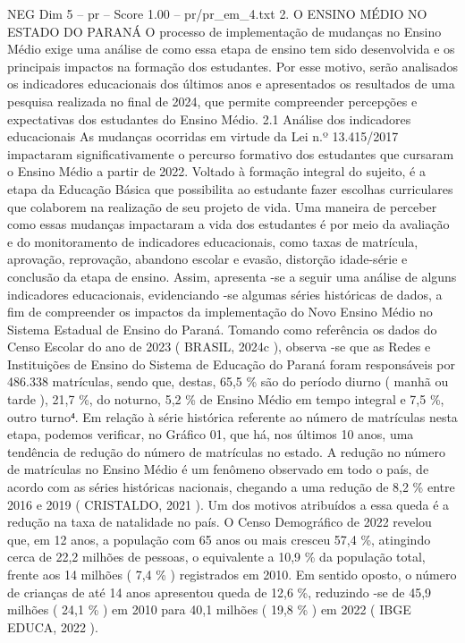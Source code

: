 \begin{textsample}{NEG Dim 5 – pr – Score 1.00 – pr/pr\_em\_4.txt}  \label{ex:f5_neg_235}
2.
O ENSINO MÉDIO NO ESTADO DO PARANÁ O processo de implementação de mudanças no Ensino Médio exige uma análise de como essa etapa de ensino tem sido desenvolvida e os principais impactos na formação dos estudantes.
Por esse motivo, serão analisados os indicadores educacionais dos últimos anos e apresentados os resultados de uma pesquisa realizada no final de 2024, que permite compreender percepções e expectativas dos estudantes do Ensino Médio. 2.1 Análise dos indicadores educacionais As mudanças ocorridas em virtude da Lei n.º 13.415/2017 impactaram significativamente o percurso formativo dos estudantes que cursaram o Ensino Médio a partir de 2022.
Voltado à formação integral do sujeito, é a etapa da Educação Básica que possibilita ao estudante fazer escolhas curriculares que colaborem na realização de seu projeto de vida.
Uma maneira de perceber como essas mudanças impactaram a vida dos estudantes é por meio da avaliação e do monitoramento de indicadores educacionais, como taxas de matrícula, aprovação, reprovação, abandono escolar e evasão, distorção idade-série e conclusão da etapa de ensino.
Assim, apresenta -se a seguir uma análise de alguns indicadores educacionais, evidenciando -se algumas séries históricas de dados, a fim de compreender os impactos da implementação do Novo Ensino Médio no Sistema Estadual de Ensino do Paraná.
Tomando como referência os dados do Censo Escolar do ano de 2023 ( BRASIL, 2024c ), observa -se que as Redes e Instituições de Ensino do Sistema de Educação do Paraná foram responsáveis por 486.338 matrículas, sendo que, destas, 65,5 \% são do período diurno ( manhã ou tarde ), 21,7 \%, do noturno, 5,2 \% de Ensino Médio em tempo integral e 7,5 \%, outro turno⁴.
Em relação à série histórica referente ao número de matrículas nesta etapa, podemos verificar, no Gráfico 01, que há, nos últimos 10 anos, uma tendência de redução do número de matrículas no estado.
A redução no número de matrículas no Ensino Médio é um fenômeno observado em todo o país, de acordo com as séries históricas nacionais, chegando a uma redução de 8,2 \% entre 2016 e 2019 ( CRISTALDO, 2021 ).
Um dos motivos atribuídos a essa queda é a redução na taxa de natalidade no país.
O Censo Demográfico de 2022 revelou que, em 12 anos, a população com 65 anos ou mais cresceu 57,4 \%, atingindo cerca de 22,2 milhões de pessoas, o equivalente a 10,9 \% da população total, frente aos 14 milhões ( 7,4 \% ) registrados em 2010.
Em sentido oposto, o número de crianças de até 14 anos apresentou queda de 12,6 \%, reduzindo -se de 45,9 milhões ( 24,1 \% ) em 2010 para 40,1 milhões ( 19,8 \% ) em 2022 ( IBGE EDUCA, 2022 ).

\end{textsample}
